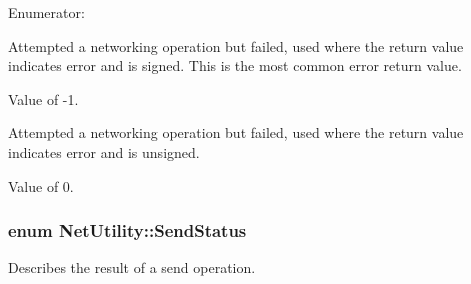 \begin{Desc}
\item[Enumerator: ]\par
\begin{description}
\item[{\em 
\hypertarget{class_net_utility_ae331fb5c7488331b51a881f5e5435ce7aa12331fede483c6bcfb76a0b46954028}{
NET\_\-ERROR}
\label{class_net_utility_ae331fb5c7488331b51a881f5e5435ce7aa12331fede483c6bcfb76a0b46954028}
}]Attempted a networking operation but failed, used where the return value indicates error and is signed. This is the most common error return value. \par
 Value of -\/1. \item[{\em 
\hypertarget{class_net_utility_ae331fb5c7488331b51a881f5e5435ce7acca94351eff26d1297605eb211efc997}{
UNSIGNED\_\-NET\_\-ERROR}
\label{class_net_utility_ae331fb5c7488331b51a881f5e5435ce7acca94351eff26d1297605eb211efc997}
}]Attempted a networking operation but failed, used where the return value indicates error and is unsigned.\par
 Value of 0. \end{description}
\end{Desc}

\hypertarget{class_net_utility_a8051eca61204ffd818281419bbf44736}{
\subsubsection[{SendStatus}]{\setlength{\rightskip}{0pt plus 5cm}enum {\bf NetUtility::SendStatus}}}
\label{class_net_utility_a8051eca61204ffd818281419bbf44736}


Describes the result of a send operation. 

